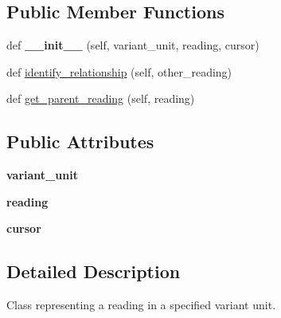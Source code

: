 \subsection*{Public Member Functions}
\begin{DoxyCompactItemize}
\item 
\mbox{\label{classCBGM_1_1lib_1_1genealogical__coherence_1_1ReadingRelationship_a081b8ca09a51fc4bea08f2d4cc956e6f}} 
def {\bfseries \+\_\+\+\_\+init\+\_\+\+\_\+} (self, variant\+\_\+unit, reading, cursor)
\item 
def \hyperlink{classCBGM_1_1lib_1_1genealogical__coherence_1_1ReadingRelationship_a5c32a031e1f4f8aceffb2197786e0900}{identify\+\_\+relationship} (self, other\+\_\+reading)
\item 
def \hyperlink{classCBGM_1_1lib_1_1genealogical__coherence_1_1ReadingRelationship_a843113796c526603255efd6baf6b4d4d}{get\+\_\+parent\+\_\+reading} (self, reading)
\end{DoxyCompactItemize}
\subsection*{Public Attributes}
\begin{DoxyCompactItemize}
\item 
\mbox{\label{classCBGM_1_1lib_1_1genealogical__coherence_1_1ReadingRelationship_a28c5f2c09bda27024688da9bb34829a7}} 
{\bfseries variant\+\_\+unit}
\item 
\mbox{\label{classCBGM_1_1lib_1_1genealogical__coherence_1_1ReadingRelationship_a17050690b94b94aa03ad91986c8b1663}} 
{\bfseries reading}
\item 
\mbox{\label{classCBGM_1_1lib_1_1genealogical__coherence_1_1ReadingRelationship_a004519c3d54055e842265174d77d6e63}} 
{\bfseries cursor}
\end{DoxyCompactItemize}


\subsection{Detailed Description}
\begin{DoxyVerb}Class representing a reading in a specified variant unit.
\end{DoxyVerb}
 


